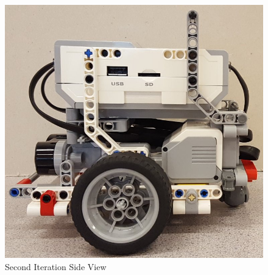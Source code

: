 \documentclass[11pt]{article}
\begin{document}
\begin{figure}[htp]
\endminipage\hfill
{}
\includegraphics[scale=0.17]{images/Hardware_Mechanical/Third_Iteration_Left.jpg}
\caption{Second Iteration Side View}\label{Side View}
\endminipage
\end{figure}
\newpage
\end{document}
